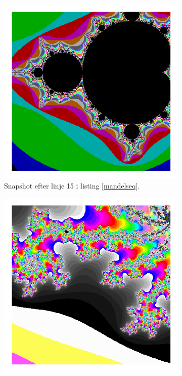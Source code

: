 \begin{figure}
    \begin{subfigure}[b]{0.3\textwidth}
        \centering
        \includegraphics[width=\textwidth]{pictures/M7.png}
        \caption{ Snapshot efter linje 15 i listing \ref{mandelseq}.}
    \end{subfigure}
    \begin{subfigure}[b]{0.3\textwidth}
        \centering
        \includegraphics[width=\textwidth]{pictures/M8.png}

\end{subfigure}
\end{figure}
